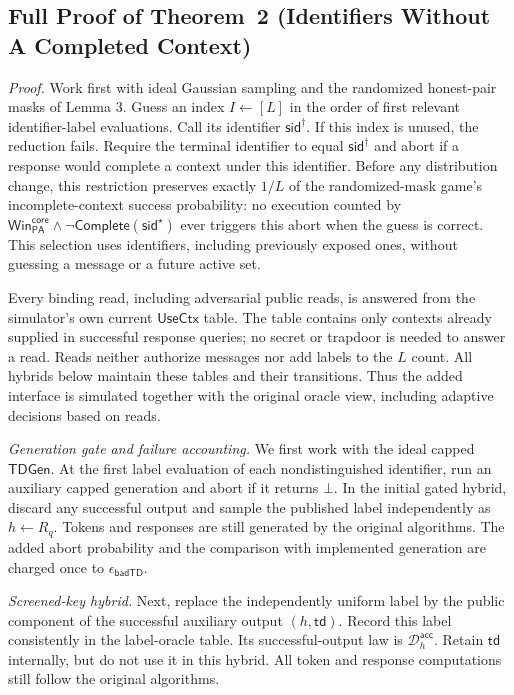 \documentclass[lettersize,journal]{IEEEtran}
\begin{document}
	\subsection{Full Proof of Theorem~2 (Identifiers Without A Completed Context)}
	\label{app:talon-theorem2-proof}
	
	\emph{Proof.}
	Work first with ideal Gaussian sampling and the randomized honest-pair
	masks of Lemma 3. Guess an index $I\leftarrow[L]$ in the order of first
	relevant identifier-label evaluations. Call its identifier
	$\mathsf{sid}^{\dagger}$. If this index is unused, the reduction fails.
	Require the terminal identifier to equal $\mathsf{sid}^{\dagger}$ and abort
	if a response would complete a context under this identifier. Before any
	distribution change, this restriction preserves exactly
	$1/L$ of the randomized-mask game's
	incomplete-context success probability: no execution counted by
	$\mathsf{Win}_{\mathsf{PA}}^{\mathsf{core}}
	\wedge\neg\mathsf{Complete}(\mathsf{sid}^{\star})$
	ever triggers this abort when the guess is correct. This selection
	uses identifiers, including previously exposed ones, without guessing a
	message or a future active set.
	
	Every binding read, including adversarial public reads, is answered from
	the simulator's own current $\mathsf{UseCtx}$ table. The table contains
	only contexts already supplied in successful response queries; no secret
	or trapdoor is needed to answer a read. Reads neither authorize messages
	nor add labels to the $L$ count. All hybrids below maintain these tables
	and their transitions. Thus the added interface is simulated together with
	the original oracle view, including adaptive decisions based on reads.
	
	\emph{Generation gate and failure accounting.}
	We first work with the ideal capped $\mathsf{TDGen}$.
	At the first label evaluation of each nondistinguished identifier,
	run an auxiliary capped generation and abort if it returns $\bot$.
	In the initial gated hybrid, discard any successful output and
	sample the published label independently as $h\leftarrow R_q$.
	Tokens and responses are still generated by the original algorithms.
	The added abort probability and the comparison with implemented
	generation are charged once to $\epsilon_{\mathsf{badTD}}$.
	
	\emph{Screened-key hybrid.}
	Next, replace the independently uniform label by the public component
	of the successful auxiliary output $(h,\mathsf{td})$.
	Record this label consistently in the label-oracle table.
	Its successful-output law is $\mathcal D_h^{\mathsf{acc}}$.
	Retain $\mathsf{td}$ internally, but do not use it in this hybrid.
	All token and response computations still follow the original algorithms.
	
\end{document}
